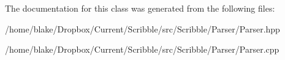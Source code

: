 The documentation for this class was generated from the following files\-:\begin{DoxyCompactItemize}
\item 
/home/blake/\-Dropbox/\-Current/\-Scribble/src/\-Scribble/\-Parser/Parser.\-hpp\item 
/home/blake/\-Dropbox/\-Current/\-Scribble/src/\-Scribble/\-Parser/Parser.\-cpp\end{DoxyCompactItemize}

